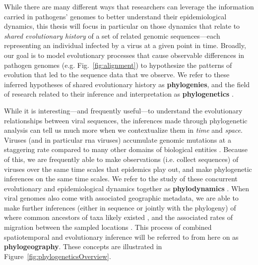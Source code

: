While there are many different ways that researchers can leverage the information carried in pathogens' genomes to better understand their epidemiological dynamics, this thesis will focus in particular on those dynamics that relate to \textit{shared evolutionary history} of a set of related genomic sequences---each representing an individual infected by a virus at a given point in time.
Broadly, our goal is to model evolutionary processes that cause observable differences in pathogen genomes (e.g. Fig.~\ref{fig:alignment}) to hypothesize the patterns of evolution that led to the sequence data that we observe.
We refer to these inferred hypotheses of shared evolutionary history as \textbf{phylogenies}, and the field of research related to their inference and interpretation as \textbf{phylogenetics} \citep{felsenstein2003inferring}.


While it is interesting---and frequently useful---to understand the evolutionary relationships between viral sequences, the inferences made through phylogenetic analysis can tell us much more when we contextualize them in \textit{time} and \textit{space}.
Viruses (and in particular \gls{rna} viruses) accumulate genomic mutations at a staggering rate compared to many other domains of biological entities \citep{duffy2008rates}.
Because of this, we are frequently able to make observations (i.e. collect sequences) of viruses over the same time scales that epidemics play out, and make phylogenetic inferences on the same time scales.
We refer to the study of these concurrent evolutionary and epidemiological dynamics together as \textbf{phylodynamics} \citep{volz2013viral}.
When viral genomes also come with associated geographic metadata, we are able to make further inferences (either in sequence or jointly with the phylogeny) of where common ancestors of taxa likely existed \citep{pybus2009evolutionary}, and the associated rates of migration between the sampled locations \citep{lemey2010phylogeography}.
This process of combined spatiotemporal and evolutionary inference will be referred to from here on as \textbf{phylogeography}.
These concepts are illustrated in Figure~\ref{fig:phylogeneticsOverview}.

